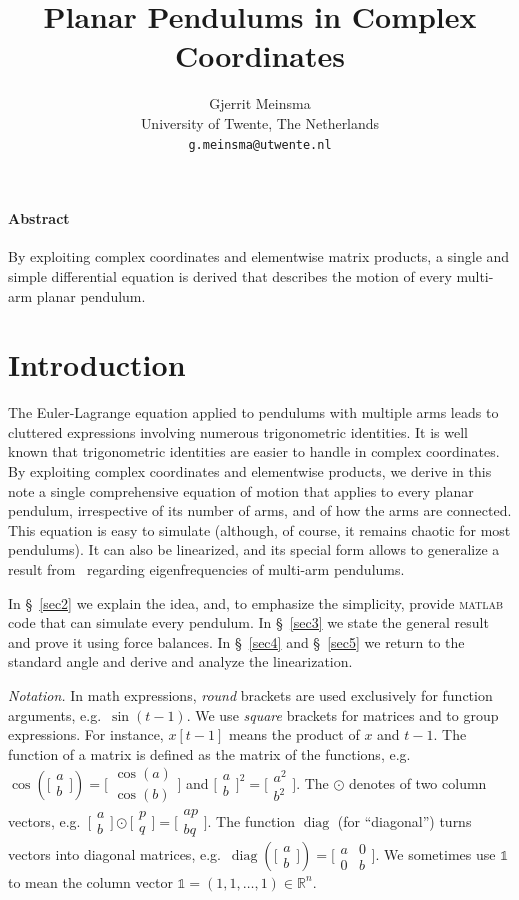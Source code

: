 \documentclass[12pt]{article}
\theoremstyle{sfdefinition}%
\theoremstyle{sfdefinition}
\newcommand{\smat}[1]{\bigl[\begin{smallmatrix} #1 
                            \end{smallmatrix}\bigr]}
\newcommand{\emphx}[1]{\underline{\smash{#1}}}
\newcommand{\one}{\mathbb{1}}
\newcommand{\mR}{\mathbb{R}}
\DeclareMathOperator{\diag}{diag}
\newcommand{\ep}{\odot}
\begin{document}
\title{Planar Pendulums in Complex Coordinates}

\author{Gjerrit Meinsma \\
  University of Twente, The Netherlands\\
  \texttt{g.meinsma@utwente.nl}}

\maketitle

\paragraph{Abstract} By exploiting complex coordinates and elementwise
matrix products, a single and simple differential equation is derived
that describes the motion of every multi-arm planar pendulum.

\section{Introduction}
The Euler-Lagrange equation applied to pendulums with multiple arms
leads to cluttered expressions involving numerous trigonometric
identities.  It is well known that trigonometric identities are easier
to handle in complex coordinates.  By exploiting complex coordinates
and elementwise products, we derive in this note a single
comprehensive equation of motion that applies to every planar
pendulum, irrespective of its number of arms, and of how the arms are
connected.  This equation is easy to simulate (although, of course, it
remains chaotic for most pendulums).  It can also be linearized, and
its special form allows to generalize a result from~\cite{BraunM2003}
regarding eigenfrequencies of multi-arm pendulums.

In \S~\ref{sec2} we explain the idea, and, to emphasize the
simplicity, provide \textsc{matlab} code that can simulate every
pendulum.  In \S~\ref{sec3} we state the general result and prove it
using force balances.  In \S~\ref{sec4} and \S~\ref{sec5} we return to
the standard angle and derive and analyze the linearization.

\emph{Notation.} In math expressions, \emph{round} brackets are used
exclusively for function arguments, e.g.~$\sin(t-1)$. We use
\emph{square} brackets for matrices and to group expressions. For
instance, $x[t-1]$ means the product of $x$ and $t-1$. The function of
a matrix is defined as the matrix of the functions, e.g.\
$\cos(\smat{a\\ b})=\smat{\cos(a)\\ \cos(b)}$ and
$\smat{a\\ b}^2=\smat{a^2\\ b^2}$.  The $\ep$ denotes
\emphx{elementwise product} of two column vectors,
e.g.~$\smat{a\\b}\ep\smat{p\\q}=\smat{ap\\bq}$.  The function $\diag$
(for ``diagonal'') turns vectors into diagonal matrices,
e.g.~$\diag(\smat{a\\ b})=\smat{a&0\\0&b}$.  We sometimes use $\one$
to mean the column vector $\one=(1,1,\ldots,1)\in\mR^n$.
\end{document}

